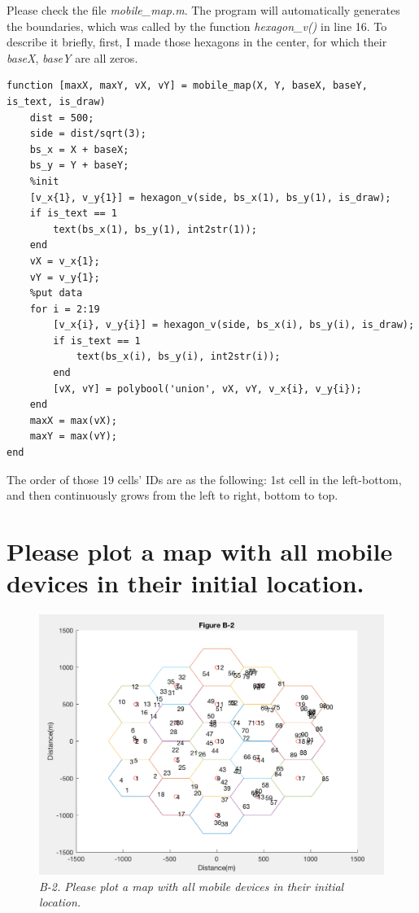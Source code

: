 \documentclass{article}
\begin{document}
Please check the file \emph{mobile\_map.m}. The program will automatically generates the boundaries, which was called by the function \emph{hexagon\_v()} in line 16. To describe it briefly, first, I made those hexagons in the center, for which their \emph{baseX}, \emph{baseY} are all zeros.

\pagebreak

\begin{lstlisting}[caption = {mobile\_map.m}]
function [maxX, maxY, vX, vY] = mobile_map(X, Y, baseX, baseY, is_text, is_draw)
    dist = 500;
    side = dist/sqrt(3);
    bs_x = X + baseX;
    bs_y = Y + baseY;
    %init
    [v_x{1}, v_y{1}] = hexagon_v(side, bs_x(1), bs_y(1), is_draw);
    if is_text == 1
        text(bs_x(1), bs_y(1), int2str(1));
    end
    vX = v_x{1};
    vY = v_y{1};
    %put data
    for i = 2:19
        [v_x{i}, v_y{i}] = hexagon_v(side, bs_x(i), bs_y(i), is_draw);
        if is_text == 1
            text(bs_x(i), bs_y(i), int2str(i));
        end
        [vX, vY] = polybool('union', vX, vY, v_x{i}, v_y{i});
    end
    maxX = max(vX);
    maxY = max(vY);
end
\end{lstlisting}


The order of those 19 cells' IDs are as the following: 1st cell in the left-bottom, and then continuously grows from the left to right, bottom to top.
\pagebreak


\section{Please plot a map with all mobile devices in their initial location.}
\begin{figure}[h]
    \centering
    \includegraphics[width=1\textwidth]{fig2}
    \caption{\emph{B-2. Please plot a map with all mobile devices in their initial location.}}
    \label{fig:mesh2}
\end{figure}
\end{document}
